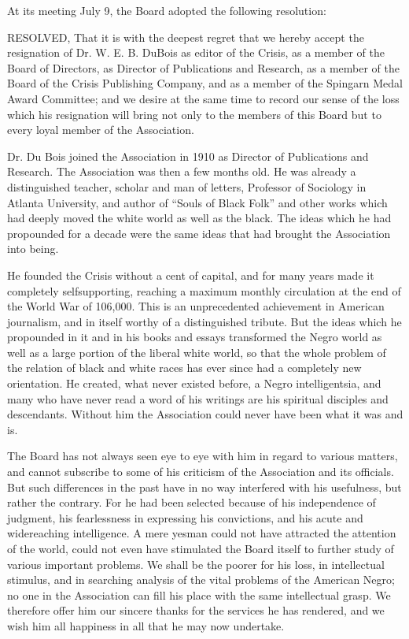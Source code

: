 \documentclass[letterpaper,10pt,english]{jupyterBook}
\begin{document}
\sphinxAtStartPar
At its meeting July 9, the Board adopted the following resolution:

\sphinxAtStartPar
RESOLVED, That it is with the deepest regret that we hereby accept the resignation of Dr. W. E. B. DuBois as editor of the Crisis, as a member of the Board of Directors, as Director of Publications and Research, as a member of the Board of the Crisis Publishing Company, and as a member of the Spingarn Medal Award Committee; and we desire at the same time to record our sense of the loss which his resignation will bring not only to the members of this Board but to every loyal member of the Association.

\sphinxAtStartPar
Dr. Du Bois joined the Association in 1910 as Director of Publications and Research. The Association was then a few months old. He was already a distinguished teacher, scholar and man of letters, Professor of Sociology in Atlanta University, and author of “Souls of Black Folk” and other works which had deeply moved the white world as well as the black. The ideas which he had propounded for a decade were the same ideas that had brought the Association into being.

\sphinxAtStartPar
He founded the Crisis without a cent of capital, and for many years made it completely self\sphinxhyphen{}supporting, reaching a maximum monthly circulation at the end of the World War of 106,000. This is an unprecedented achievement in American journalism, and in itself worthy of a distinguished tribute. But the ideas which he propounded in it and in his books and essays transformed the Negro world as well as a large portion of the liberal white world, so that the whole problem of the relation of black and white races has ever since had a completely new orientation. He created, what never existed before, a Negro intelligentsia, and many who have never read a word of his writings are his spiritual disciples and descendants. Without him the Association could never have been what it was and is.

\sphinxAtStartPar
The Board has not always seen eye to eye with him in regard to various matters, and cannot subscribe to some of his criticism of the Association and its officials. But such differences in the past have in no way interfered with his usefulness, but rather the contrary. For he had been selected because of his independence of judgment, his fearlessness in expressing his convictions, and his acute and wide\sphinxhyphen{}reaching intelligence. A mere yes\sphinxhyphen{}man could not have attracted the attention of the world, could not even have stimulated the Board itself to further study of various important problems. We shall be the poorer for his loss, in intellectual stimulus, and in searching analysis of the vital problems of the American Negro; no one in the Association can fill his place with the same intellectual grasp. We therefore offer him our sincere thanks for the services he has rendered, and we wish him all happiness in all that he may now undertake.
\end{document}
